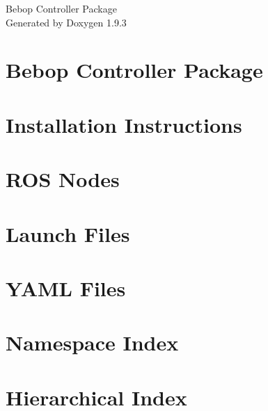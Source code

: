 \documentclass[twoside]{book}
\newcommand{\+}{\discretionary{\mbox{\scriptsize$\hookleftarrow$}}{}{}}
\newcommand{\clearemptydoublepage}{%
    \newpage{\pagestyle{empty}\cleardoublepage}%
  }
\begin{document}
  \raggedbottom
    \hypersetup{pageanchor=false,
                bookmarksnumbered=true,
                pdfencoding=unicode
               }
  \begin{titlepage}
  \vspace*{7cm}
  \begin{center}%
  {\Large Bebop Controller Package}\\
  \vspace*{1cm}
  {\large Generated by Doxygen 1.9.3}\\
  \end{center}
  \end{titlepage}
  \clearemptydoublepage
  \tableofcontents
  \clearemptydoublepage
  \hypersetup{pageanchor=true}
\chapter{Bebop Controller Package}
\label{index}\hypertarget{index}{}
\chapter{Installation Instructions}
\label{installation}

\chapter{ROS Nodes}
\label{ros_nodes}

\chapter{Launch Files}
\label{launch_files}

\chapter{YAML Files}
\label{yaml_files}

\chapter{Namespace Index}

\chapter{Hierarchical Index}

\end{document}
